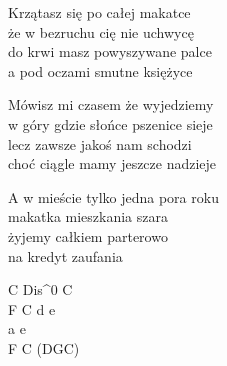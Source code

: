 \begin{text}
    Krzątasz się po całej makatce\\
    że w bezruchu cię nie uchwycę\\
    do krwi masz powyszywane palce\\
    a pod oczami smutne księżyce

    Mówisz mi czasem że wyjedziemy\\
    w góry gdzie słońce pszenice sieje\\
    lecz zawsze jakoś nam schodzi\\
    choć ciągle mamy jeszcze nadzieje

    A w mieście tylko jedna pora roku\\
    makatka mieszkania szara\\
    żyjemy całkiem parterowo\\
    na kredyt zaufania
\end{text}
\begin{chord}
    C Dis^{0} C\\
    F C d e\\
    a e\\
    F C (DGC)

\end{chord}